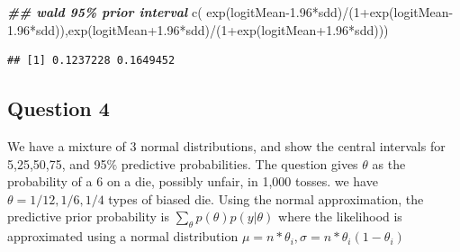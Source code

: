 \documentclass[
]{book}
\newenvironment{Shaded}{\begin{snugshade}}{\end{snugshade}}
\newcommand{\DecValTok}[1]{\textcolor[rgb]{0.00,0.00,0.81}{#1}}
\newcommand{\DocumentationTok}[1]{\textcolor[rgb]{0.56,0.35,0.01}{\textbf{\textit{#1}}}}
\newcommand{\FloatTok}[1]{\textcolor[rgb]{0.00,0.00,0.81}{#1}}
\newcommand{\FunctionTok}[1]{\textcolor[rgb]{0.00,0.00,0.00}{#1}}
\newcommand{\NormalTok}[1]{#1}
\newcommand{\SpecialCharTok}[1]{\textcolor[rgb]{0.00,0.00,0.00}{#1}}
\theoremstyle{definition}
\theoremstyle{definition}
\theoremstyle{definition}
\theoremstyle{definition}
\theoremstyle{remark}
\begin{document}
\begin{Shaded}
\begin{Highlighting}[]
\DocumentationTok{\#\# wald 95\% prior interval}
\FunctionTok{c}\NormalTok{( }\FunctionTok{exp}\NormalTok{(logitMean}\FloatTok{{-}1.96}\SpecialCharTok{*}\NormalTok{sdd)}\SpecialCharTok{/}\NormalTok{(}\DecValTok{1}\SpecialCharTok{+}\FunctionTok{exp}\NormalTok{(logitMean}\FloatTok{{-}1.96}\SpecialCharTok{*}\NormalTok{sdd)),}\FunctionTok{exp}\NormalTok{(logitMean}\FloatTok{+1.96}\SpecialCharTok{*}\NormalTok{sdd)}\SpecialCharTok{/}\NormalTok{(}\DecValTok{1}\SpecialCharTok{+}\FunctionTok{exp}\NormalTok{(logitMean}\FloatTok{+1.96}\SpecialCharTok{*}\NormalTok{sdd)))}
\end{Highlighting}
\end{Shaded}

\begin{verbatim}
## [1] 0.1237228 0.1649452
\end{verbatim}

\hypertarget{question-4}{%
\subsection*{Question 4}\label{question-4}}

We have a mixture of 3 normal distributions, and show the central intervals for 5,25,50,75, and 95\(\%\) predictive probabilities. The question gives \(\theta\) as the probability of a 6 on a die, possibly unfair, in 1,000 tosses. we have \(\theta= 1/12,1/6, 1/4\) types of biased die. Using the normal approximation, the predictive prior probability is \(\sum_{\theta}p(\theta)p(y| \theta)\) where the likelihood is approximated using a normal distribution \(\mu = n*\theta_i, \sigma = n*\theta_i(1-\theta_i)\)
\end{document}
